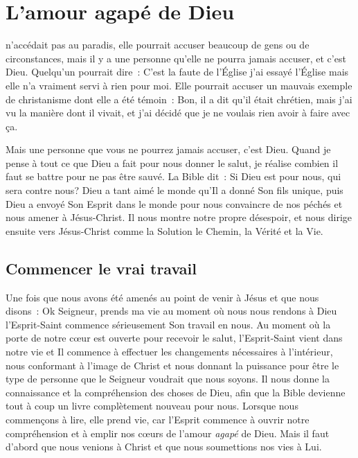 \chapter{L'amour agapé de Dieu}

 n'accédait pas au paradis,
 elle pourrait accuser beaucoup de gens
 ou de circonstances, mais il y a une personne
 qu'elle ne pourra jamais accuser, et c'est Dieu.
 Quelqu'un pourrait dire~:
 \og C'est la faute de l'Église \ocadr j'ai essayé l'Église mais
 elle n'a vraiment servi à rien pour moi. \fg{}
 Elle pourrait accuser un mauvais exemple de christanisme
 dont elle a été témoin~:
 \og Bon, il a dit qu'il était chrétien, mais j'ai vu la manière
 dont il vivait, et j'ai décidé que je ne voulais rien avoir à faire
 avec ça. \fg{}

Mais une personne que vous ne pourrez jamais accuser, c'est Dieu.
 Quand je pense à tout ce que Dieu a fait pour nous donner le salut,
 je réalise combien il faut se battre pour ne pas être sauvé.
 La Bible dit~:
 \og Si Dieu est pour nous, qui sera contre nous? \fg{}
 Dieu a tant aimé le monde qu'Il a donné Son fils unique,
 puis Dieu a envoyé Son Esprit dans le monde pour nous convaincre
 de nos péchés et nous amener à Jésus-Christ.
 Il nous montre notre propre désespoir, et nous dirige ensuite
 vers Jésus-Christ comme la Solution \ocadr le Chemin, la Vérité et la Vie.

\section*{Commencer le vrai travail}

Une fois que nous avons été amenés au point de venir à Jésus
 et que nous disons~:
 \og Ok Seigneur, prends ma vie \fg{}
 \ocadr au moment où nous nous rendons à Dieu \fcadr
 l'Esprit-Saint commence sérieusement Son travail en nous.
 Au moment où la porte de notre cœur est ouverte pour recevoir le salut,
 l'Esprit-Saint vient dans notre vie et Il commence à effectuer
 les changements nécessaires à l'intérieur, nous conformant
 à l'image de Christ et nous donnant la puissance pour être
 le type de personne que le Seigneur voudrait que nous soyons.
 Il nous donne la connaissance et la compréhension des choses de Dieu,
 afin que la Bible devienne tout à coup un livre complètement
 nouveau pour nous. Lorsque nous commençons à lire,
 elle prend vie, car l'Esprit commence à ouvrir notre compréhension
 et à emplir nos cœurs de l'amour \emph{agapé} de Dieu.
 Mais il faut d'abord que nous venions à Christ
 et que nous soumettions nos vies à Lui.

